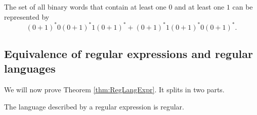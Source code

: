 \begin{page}
\setcounter{section}{2}
\setcounter{subsection}{1}
\setcounter{dfn}{6}
\label{portion:967}

\begin{exl}
The set of all binary words that contain at least one $0$ and at least one $1$
can be represented by
\[
(0+1)^*0(0+1)^*1(0+1)^* + (0+1)^*1(0+1)^*0(0+1)^*.
\]
\end{exl}

\end{page}

\begin{page}
\setcounter{section}{2}
\setcounter{subsection}{2}
\setcounter{dfn}{6}
\label{portion:969}

\subsection{Equivalence of regular expressions and regular languages}
We will now prove Theorem \ref{thm:RegLangExpr}.
It splits in two parts.


\end{page}

\begin{page}
\setcounter{section}{2}
\setcounter{subsection}{2}
\setcounter{dfn}{7}
\label{portion:971}

\begin{lem}
The language described by a regular expression is regular.
\end{lem}

\end{page}

